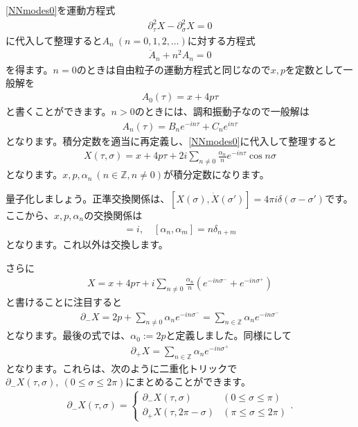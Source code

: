 \documentclass[report,paper=a4, fontsize=12pt, line_length=16cm, number_of_lines=34,dvipdfmx]{jlreq}
\numberwithin{equation}{chapter}
\numberwithin{equation}{section}
\newcommand{\Zb}{\mathbb{Z}}
\newcommand{\del}{\partial}
\begin{document}
\eqref{NNmodes0}を運動方程式
\begin{align}
  \del_{\tau}^2X-\del_{\sigma}^2X=0
\end{align}
に代入して整理すると$A_n\ (n=0,1,2,\dots)$に対する方程式
\begin{align}
  \ddot{A}_{n}+n^2 A_n=0
\end{align}
を得ます。$n=0$のときは自由粒子の運動方程式と同じなので$x,p$を定数として一般解を
\begin{align}
  A_{0}(\tau)=x+4p\tau
\end{align}
と書くことができます。$n>0$のときには、調和振動子なので一般解は
\begin{align}
  A_{n}(\tau)=B_{n}e^{-in\tau}+C_{n}e^{in\tau}
\end{align}
となります。積分定数を適当に再定義し、\eqref{NNmodes0}に代入して整理すると
\begin{align}
  X(\tau,\sigma)=x+4p\tau+2i\sum_{n\ne 0}
  \frac{\alpha_{n}}{n}e^{-in\tau}\cos n\sigma
\end{align}
となります。$x,p,\alpha_{n}\ (n\in \Zb, n \ne 0)$が積分定数になります。

量子化しましょう。正準交換関係は、$[X(\sigma),\dot{X}(\sigma')]=4\pi i \delta(\sigma-\sigma')$です。ここから、$x,p,\alpha_{n}$の交換関係は
\begin{align}
  [x,p]=i,\quad [\alpha_{n},\alpha_{m}]=n\delta_{n+m}
\end{align}
となります。これ以外は交換します。

さらに
\begin{align}
  X=x+4p\tau+i\sum_{n\ne 0}\frac{\alpha_{n}}{n}(e^{-in\sigma^{-}}+e^{-in\sigma^{+}})
\end{align}
と書けることに注目すると
\begin{align}
  \del_{-}X=2p+\sum_{n\ne 0}\alpha_{n}e^{-in\sigma^{-}}
  =\sum_{n\in \Zb}\alpha_{n}e^{-in\sigma^{-}}
\end{align}
となります。最後の式では、$\alpha_{0}:=2p$と定義しました。同様にして
\begin{align}
  \del_{+}X=\sum_{n\in \Zb}\alpha_{n}e^{-in\sigma^{+}}
\end{align}
となります。これらは、次のように二重化トリックで$\del_{-}X(\tau,\sigma),\ (0\le \sigma \le 2\pi)$にまとめることができます。
\begin{align}
  \del_{-}X(\tau,\sigma)=
  \begin{cases}
    \del_{-}X(\tau,\sigma)& (0\le \sigma \le \pi)\\
    \del_{+}X(\tau,2\pi-\sigma) & (\pi\le \sigma \le 2\pi)
  \end{cases}.
\end{align}
\end{document}
